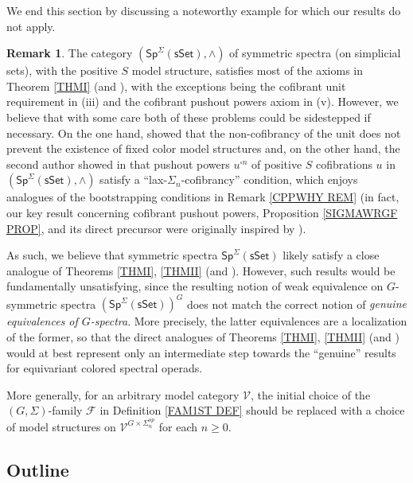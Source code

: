 \documentclass[a4paper,10pt
,draft
]{article}%
\numberwithin{equation}{section}
\numberwithin{figure}{section}
\theoremstyle{definition} %
\newtheorem{remark}[equation]{Remark}%
\newcommand{\F}{\ensuremath{\mathcal F}}
\newcommand{\V}{\ensuremath{\mathcal V}}
\newcommand{\1}{\ensuremath{\mathbbm 1}}%
\begin{document}
We end this section by discussing a noteworthy 
example for which our results do not apply.


\begin{remark}\label{SPNONEX REM}
	The category $(\mathsf{Sp}^{\Sigma}(\mathsf{sSet}),\wedge)$
	of symmetric spectra (on simplicial sets),
	with the positive $S$ model structure,
	satisfies most of the axioms in Theorem
	\ref{THMI} (and \cite[Thm. \ref{AC-THMA}]{BP_ACOP}), 
	with the exceptions being 
	the cofibrant unit requirement in (iii)
	and the cofibrant pushout powers axiom in (v).
	However, we believe that with some care 
	both of these problems could be sidestepped
	if necessary. 
	On the one hand, \cite{GV12}
	showed that the non-cofibrancy of the unit 
	does not prevent the existence of fixed color model structures
	and, on the other hand, 
	the second author showed in \cite{Pe16}
	that pushout powers $u^{\square n}$ of positive $S$ cofibrations $u$
	in $(\mathsf{Sp}^{\Sigma}(\mathsf{sSet}),\wedge)$
	satisfy a ``lax-$\Sigma_n$-cofibrancy'' condition,
	which enjoys analogues of the bootstrapping conditions
	in Remark \ref{CPPWHY REM}
	(in fact, our key result concerning cofibrant pushout powers,
	Proposition \ref{SIGMAWRGF PROP}, and its direct precursor
	\cite[Prop. 6.24]{BP_geo}
	were originally inspired by \cite[Thm. 1.2]{Pe16}).

	As such, we believe that symmetric spectra
	$\mathsf{Sp}^{\Sigma}(\mathsf{sSet})$
	likely satisfy a close analogue of Theorems 
	\ref{THMI}, \ref{THMII} (and \cite[Thm. \ref{AC-THMA}]{BP_ACOP}).
	However, such results 
	would be fundamentally unsatisfying, 
	since the resulting notion of weak equivalence on
	$G$-symmetric spectra
	$\left(\mathsf{Sp}^{\Sigma}(\mathsf{sSet})\right)^G$
	does not match the correct notion of 
	\emph{genuine equivalences of $G$-spectra}.
	More precisely, the latter equivalences are a localization of the former, so that the direct analogues of 
	Theorems \ref{THMI}, \ref{THMII} (and \cite[Thm. \ref{AC-THMA}]{BP_ACOP})
	would at best represent only an intermediate step
	towards the ``genuine'' results
	for equivariant colored spectral operads.

	More generally,
	for an arbitrary model category $\V$,
	the initial choice of the $(G,\Sigma)$-family $\F$ in  
	Definition \ref{FAM1ST DEF}
	should be replaced with a choice of model structures on
	$\V^{G \times \Sigma_n^{op}}$
	for each $n \geq 0$.	 
\end{remark}



\subsection{Outline}
\end{document}

